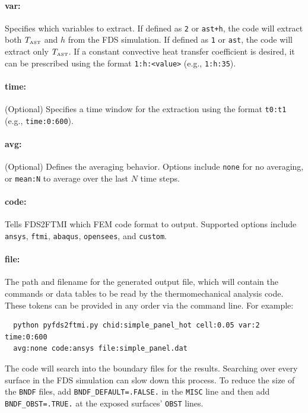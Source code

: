 \documentclass[11pt]{book}
\newcommand{\textct}[1]{\texttt{#1}}
\begin{document}
\paragraph{var:} 
Specifies which variables to extract. If defined as \texttt{2} or \texttt{ast+h}, the code will extract both $T_{\hbox{\tiny AST}}$ and $h$ from the FDS simulation. If defined as \texttt{1} or \texttt{ast}, the code will extract only $T_{\hbox{\tiny AST}}$. If a constant convective heat transfer coefficient is desired, it can be prescribed using the format \texttt{1:h:<value>} (e.g., \texttt{1:h:35}).

\paragraph{time:} 
(Optional) Specifies a time window for the extraction using the format \texttt{t0:t1} (e.g., \texttt{time:0:600}).

\paragraph{avg:} 
(Optional) Defines the averaging behavior. Options include \texttt{none} for no averaging, or \texttt{mean:N} to average over the last $N$ time steps.

\paragraph{code:}
Tells FDS2FTMI which FEM code format to output. Supported options include \texttt{ansys}, \texttt{ftmi}, \texttt{abaqus}, \texttt{opensees}, and \texttt{custom}.

\paragraph{file:}
The path and filename for the generated output file, which will contain the commands or data tables to be read by the thermomechanical analysis code.
\\

These tokens can be provided in any order via the command line. For example:
\begin{verbatim}
  python pyfds2ftmi.py chid:simple_panel_hot cell:0.05 var:2 time:0:600 
  avg:none code:ansys file:simple_panel.dat
\end{verbatim}

The code will search into the boundary files for the results. Searching over every surface in the FDS simulation can slow down this process. To reduce the size of the \textct{BNDF} files, add \textct{BNDF\_DEFAULT=.FALSE.} in the \textct{MISC} line and then add \textct{BNDF\_OBST=.TRUE.} at the exposed surfaces' \textct{OBST} lines.
\end{document}
